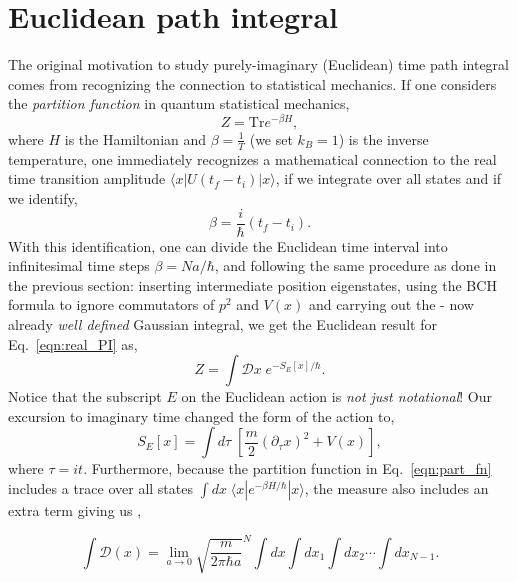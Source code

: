 \documentclass[11pt]{article}
\newcommand{\sideex}[1]{\marginnote{\footnotesize\textcolor{red!50!black}{#1}}}
\theoremstyle{definition}
\begin{document}
\section{Euclidean path integral}
The original motivation to study purely-imaginary (Euclidean) time path integral comes from recognizing the connection to statistical mechanics. If one considers the \textit{partition function} in quantum statistical mechanics,
\begin{equation}\label{eqn:part_fn}
Z = \text{Tr} e^{-\beta H},  
\end{equation}
where $H$ is the Hamiltonian and $\beta = \frac{1}{T}$ (we set $k_B=1$) is the inverse temperature, one immediately recognizes a mathematical connection to the real time transition amplitude $\langle x |U(t_f-t_i)| x \rangle$, if we integrate over all states and if we identify,
\begin{equation}
  \beta = \frac{i}{\hbar} (t_f - t_i).
\end{equation}
With this identification, one can divide the Euclidean time interval into infinitesimal time steps $\beta = N a/\hbar$, and following the same procedure as done in the previous section: inserting intermediate position eigenstates, using the BCH formula to ignore commutators of $p^2$ and $V(x)$ and carrying out the - now already \textit{well defined} Gaussian integral, we get the Euclidean result for Eq.~\eqref{eqn:real_PI} as,
\begin{equation}
  Z = \int \mathcal{D}x \; e^{-S_E[x]/\hbar}.
\end{equation}
Notice that the subscript $E$ on the Euclidean action is \textit{not just notational}! Our excursion to imaginary time changed the form of the action to,
\begin{equation}
  S_E[x] = \int d \tau \; \left[\frac{m}{2} {(\partial_{\tau} x)}^2 + V(x)\right],
\end{equation}
where $\tau = i t$. Furthermore, because the partition function in Eq.~\eqref{eqn:part_fn} includes a trace over all states $\int dx \; \langle x |e^{-\beta H/\hbar} | x \rangle$, the measure also includes an extra term giving us \sideex{There is an exercise related to counting the number of integrals one needs for a given field theory on a given spacetime lattice!},

\begin{equation}
  \int \mathcal{D}(x) = \lim_{a \to 0} \sqrt{\frac{m}{2 \pi \hbar a}}^N \int dx \int dx_1 \int dx_2 \cdots \int dx_{N-1}.
\end{equation}
\end{document}
